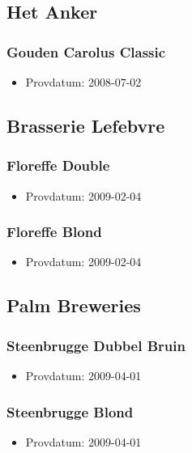 \documentclass[11pt]{article}
\begin{document}
\subsection{Het Anker}
\label{sec:orgb161e62}
\subsubsection{Gouden Carolus Classic}
\label{sec:org6c33ff5}
\begin{itemize}
\item Provdatum: 2008-07-02
\end{itemize}
\subsection{Brasserie Lefebvre}
\label{sec:org91c9d78}
\subsubsection{Floreffe Double}
\label{sec:org2661813}
\begin{itemize}
\item Provdatum: 2009-02-04
\end{itemize}
\subsubsection{Floreffe Blond}
\label{sec:orga747f63}
\begin{itemize}
\item Provdatum: 2009-02-04
\end{itemize}
\subsection{Palm Breweries}
\label{sec:org579ff52}
\subsubsection{Steenbrugge Dubbel Bruin}
\label{sec:orgf20118b}
\begin{itemize}
\item Provdatum: 2009-04-01
\end{itemize}
\subsubsection{Steenbrugge Blond}
\label{sec:org8331fd3}
\begin{itemize}
\item Provdatum: 2009-04-01
\end{itemize}
\end{document}
